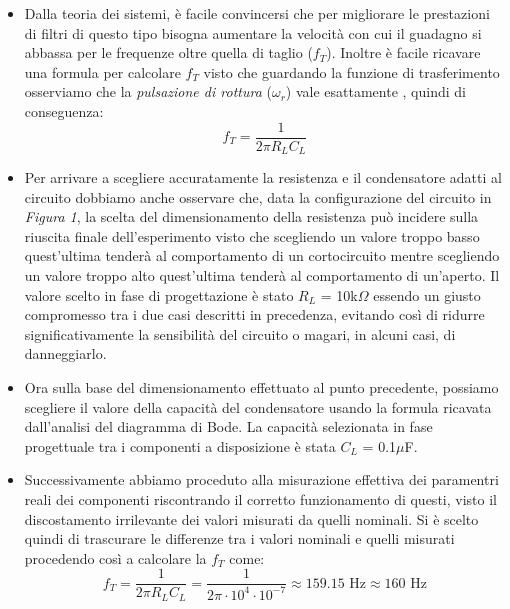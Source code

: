 \documentclass{article}
\begin{document}
\begin{itemize}
    \item Dalla teoria dei sistemi, è facile convincersi che per migliorare le prestazioni di
          filtri di questo tipo bisogna aumentare la velocità con cui il guadagno si abbassa per
          le frequenze oltre quella di taglio ($f_{T}$). Inoltre è facile ricavare una formula per
          calcolare $f_{T}$ visto che guardando la funzione di trasferimento osserviamo che la 
          \textit{pulsazione di rottura} ($\omega_{r}$) vale esattamente
          , quindi di conseguenza: \\
          \begin{equation}
            \boxed{f_{T} = \frac{1}{2\pi R_{L}C_{L}}}
          \end{equation}

    \item Per arrivare a scegliere accuratamente la resistenza e il condensatore adatti al circuito
          dobbiamo anche osservare che, data la configurazione del circuito in \textit{Figura 1}, la scelta
          del dimensionamento della resistenza può incidere sulla riuscita finale dell'esperimento visto che
          scegliendo un valore troppo basso quest'ultima tenderà al comportamento di un cortocircuito
          mentre scegliendo un valore troppo alto quest'ultima tenderà al comportamento di un'aperto. Il
          valore scelto in fase di progettazione è stato $R_{L}$ = 10k$\Omega$ essendo un giusto compromesso tra
          i due casi descritti in precedenza, evitando così di ridurre significativamente la sensibilità del
          circuito o magari, in alcuni casi, di danneggiarlo.

    \item Ora sulla base del dimensionamento effettuato al punto precedente, possiamo scegliere il valore della
          capacità del condensatore usando la formula ricavata dall'analisi del diagramma di Bode. La capacità
          selezionata in fase progettuale tra i componenti a disposizione è stata $C_{L}$ = 0.1$\mu$F. 

    \item Successivamente abbiamo proceduto alla misurazione effettiva dei paramentri reali dei componenti
          riscontrando il corretto funzionamento di questi, visto il discostamento irrilevante dei valori misurati
          da quelli nominali. Si è scelto quindi di trascurare le differenze tra i valori nominali e quelli misurati
          procedendo così a calcolare la $f_{T}$ come:
          \begin{equation}
            \boxed{f_{T} = \frac{1}{2\pi R_{L}C_{L}} = \frac{1}{2\pi \cdot 10^4 \cdot 10^{-7}} \approx 159.15 \text{ Hz} \approx 160 \text{ Hz}}
          \end{equation}
  \end{itemize}
\newpage
\end{document}
